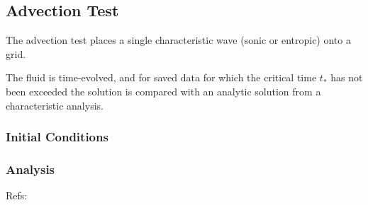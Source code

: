 \subsection{Advection Test}

The advection test places a single characteristic wave (sonic or entropic) onto a grid.

The fluid is time-evolved, and for saved data for which the critical time $t_*$ has not 
been exceeded the solution is compared with an analytic solution from a characteristic
analysis.

\subsubsection{Initial Conditions}

\subsubsection{Analysis}


Refs:


